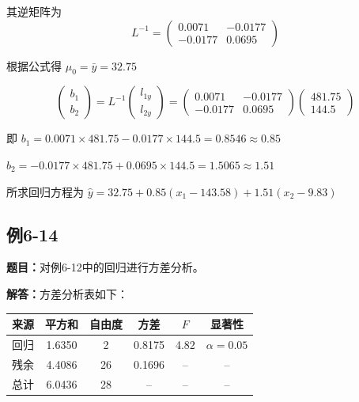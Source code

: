 \documentclass[UTF8,zihao=-4]{ctexart}
\newcommand{\problem}[1]{\subsection*{#1}}
\newcommand{\timu}{\noindent\textbf{题目：}}
\newcommand{\jieda}{\noindent\textbf{解答：}}
\begin{document}
其逆矩阵为
\begin{equation*}
L^{-1}
    =
    \begin{pmatrix}
        0.0071 & -0.0177\\
        -0.0177 & 0.0695
    \end{pmatrix}
\end{equation*}

根据公式得 $\mu_0=\bar{y}=32.75$

\begin{equation*}
\begin{pmatrix}
        b_1\\
        b_2
    \end{pmatrix}
    =
    L^{-1}
    \begin{pmatrix}
        l_{1y}\\
        l_{2y}
    \end{pmatrix}
    =
    \begin{pmatrix}
        0.0071 & -0.0177\\
        -0.0177 & 0.0695
    \end{pmatrix}
    \begin{pmatrix}
        481.75\\
        144.5
    \end{pmatrix}
\end{equation*}

即 $b_1=0.0071\times481.75-0.0177\times144.5=0.8546\approx0.85$

$b_2=-0.0177\times481.75+0.0695\times144.5=1.5065\approx1.51$

所求回归方程为 $\hat{y} = 32.75+0.85(x_1-143.58)+1.51(x_2-9.83)$

\newpage

\problem{例6-14}

\timu 对例6-12中的回归进行方差分析。

\jieda 方差分析表如下：

\begin{center}
\small
\setlength{\tabcolsep}{5pt}
\begin{tabular}{c|c|c|c|c|c}
\toprule
来源 & 平方和 & 自由度 & 方差 & $F$ & 显著性\\
\midrule
回归 & 1.6350 & 2 & 0.8175 & 4.82 & $\alpha=0.05$\\
残余 & 4.4086 & 26 & 0.1696 & -- & --\\
总计 & 6.0436 & 28 & -- & -- & --\\
\bottomrule
\end{tabular}
\end{center}
\end{document}
